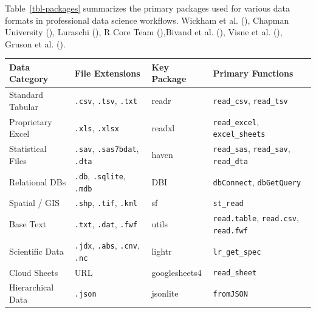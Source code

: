\documentclass[
  doc,
  longtable,
  a4paper,
  nolmodern,
  notxfonts,
  notimes,
  colorlinks=true,linkcolor=blue,citecolor=blue,urlcolor=blue]{apa7}
\newcounter{none} %
\begin{document}
Table~\ref{tbl-packages} summarizes the primary packages used for
various data formats in professional data science workflows. {Wickham et
al.} (), Chapman University
(), Luraschi
(), R Core Team
(),Bivand et al.
(), Visne et al.
(), Gruson et al.
().

\begin{table}

{\caption{{Overview of data import packages}{\label{tbl-packages}}}}

{\def\LTcaptype{none} %
\begin{longtable}[]{@{}
  >{\raggedright\arraybackslash}p{}
  >{\raggedright\arraybackslash}p{}
  >{\raggedright\arraybackslash}p{}
  >{\raggedright\arraybackslash}p{}@{}}
\toprule\noalign{}
\begin{minipage}[b]{\linewidth}\raggedright
Data Category
\end{minipage} & \begin{minipage}[b]{\linewidth}\raggedright
File Extensions
\end{minipage} & \begin{minipage}[b]{\linewidth}\raggedright
Key Package
\end{minipage} & \begin{minipage}[b]{\linewidth}\raggedright
Primary Functions
\end{minipage} \\
\midrule\noalign{}
\endhead
\bottomrule\noalign{}
\endlastfoot
Standard Tabular & \texttt{.csv}, \texttt{.tsv}, \texttt{.txt} & readr &
\texttt{read\_csv}, \texttt{read\_tsv} \\
Proprietary Excel & \texttt{.xls}, \texttt{.xlsx} & readxl &
\texttt{read\_excel}, \texttt{excel\_sheets} \\
Statistical Files & \texttt{.sav}, \texttt{.sas7bdat}, \texttt{.dta} &
haven & \texttt{read\_sas}, \texttt{read\_sav}, \texttt{read\_dta} \\
Relational DBs & \texttt{.db}, \texttt{.sqlite}, \texttt{.mdb} & DBI &
\texttt{dbConnect}, \texttt{dbGetQuery} \\
Spatial / GIS & \texttt{.shp}, \texttt{.tif}, \texttt{.kml} & sf &
\texttt{st\_read} \\
Base Text & \texttt{.txt}, \texttt{.dat}, \texttt{.fwf} & utils &
\texttt{read.table}, \texttt{read.csv}, \texttt{read.fwf} \\
Scientific Data & \texttt{.jdx}, \texttt{.abs}, \texttt{.cnv},
\texttt{.nc} & lightr & \texttt{lr\_get\_spec} \\
Cloud Sheets & URL & googlesheets4 & \texttt{read\_sheet} \\
Hierarchical Data & \texttt{.json} & jsonlite & \texttt{fromJSON} \\
\end{longtable}
}


\end{table}
\end{document}
